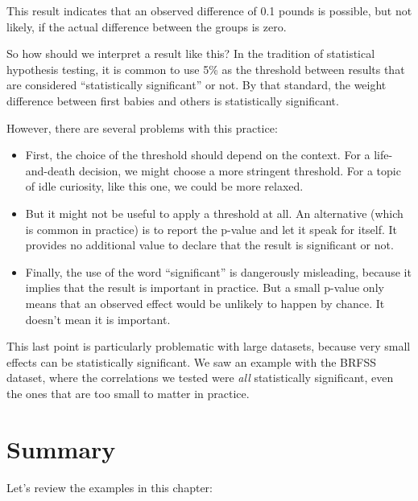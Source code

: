This result indicates that an observed difference of 0.1 pounds is
possible, but not likely, if the actual difference between the groups is
zero.

So how should we interpret a result like this? In the tradition of
statistical hypothesis testing, it is common to use 5\% as the threshold
between results that are considered ``statistically significant'' or
not. By that standard, the weight difference between first babies and
others is statistically significant.

However, there are several problems with this practice:

\begin{itemize}
\item
  First, the choice of the threshold should depend on the context. For a
  life-and-death decision, we might choose a more stringent threshold.
  For a topic of idle curiosity, like this one, we could be more
  relaxed.
\item
  But it might not be useful to apply a threshold at all. An alternative
  (which is common in practice) is to report the p-value and let it
  speak for itself. It provides no additional value to declare that the
  result is significant or not.
\item
  Finally, the use of the word ``significant'' is dangerously
  misleading, because it implies that the result is important in
  practice. But a small p-value only means that an observed effect would
  be unlikely to happen by chance. It doesn't mean it is important.
\end{itemize}

This last point is particularly problematic with large datasets, because
very small effects can be statistically significant. We saw an example
with the BRFSS dataset, where the correlations we tested were \emph{all}
statistically significant, even the ones that are too small to matter in
practice.

\hypertarget{summary}{%
\section{Summary}\label{summary}}

Let's review the examples in this chapter:

